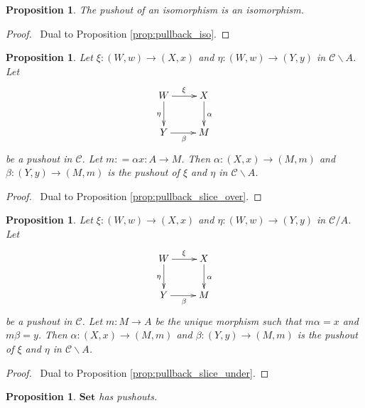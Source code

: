 \documentclass{book}
\let\qed\relax
\newtheorem{prop}[ax]{Proposition}
\theoremstyle{definition}
\newcommand{\Set}{\ensuremath{\mathbf{Set}}}
\begin{document}
\begin{prop}
The pushout of an isomorphism is an isomorphism.
\end{prop}

\begin{proof}
\pf\ Dual to Proposition \ref{prop:pullback_iso}. \qed
\end{proof}

\begin{prop}
Let $\xi : (W,w) \rightarrow (X,x)$ and $\eta : (W,w) \rightarrow (Y,y)$ in $\mathcal{C} \backslash A$. Let
\[ \xymatrix{
W \ar[r]^\xi \ar[d]_\eta & X \ar[d]^\alpha \\
Y \ar[r]_\beta & M
} \]
be a pushout in $\mathcal{C}$. Let $m : = \alpha x : A \rightarrow M$. Then $\alpha : (X,x) \rightarrow (M,m)$ and $\beta : (Y,y) \rightarrow (M,m)$ is the pushout of $\xi$ and $\eta$ in $\mathcal{C} \backslash A$.
\end{prop}

\begin{proof}
\pf\ Dual to Proposition \ref{prop:pullback_slice_over}. \qed
\end{proof}

\begin{prop}
Let $\xi : (W,w) \rightarrow (X,x)$ and $\eta : (W,w) \rightarrow (Y,y)$ in $\mathcal{C} / A$. Let
\[ \xymatrix{
W \ar[r]^\xi \ar[d]_\eta & X \ar[d]^\alpha \\
Y \ar[r]_\beta & M
} \]
be a pushout in $\mathcal{C}$. Let $m : M \rightarrow A$ be the unique morphism such that $m \alpha = x$ and $m \beta = y$. Then $\alpha : (X,x) \rightarrow (M,m)$ and $\beta : (Y,y) \rightarrow (M,m)$ is the pushout of $\xi$ and $\eta$ in $\mathcal{C} \backslash A$.
\end{prop}

\begin{proof}
\pf\ Dual to Proposition \ref{prop:pullback_slice_under}. \qed
\end{proof}

\begin{prop}
$\Set$ has pushouts.
\end{prop}
\end{document}
